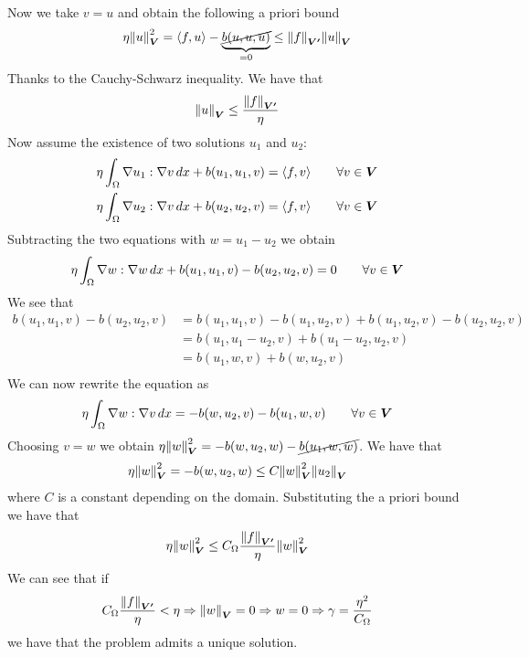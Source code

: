 \begin{enumerate}
\[\begin{split}
        \end{split}
    \]
    Now we take \(v = u\) and obtain the following a priori bound
    \[
        \begin{split}
            \eta \norm{u}_{\bm{V}}^2 = \langle f, u \rangle - \underbrace{\cancel{b(u, u, u)}}_{=0} \leq \norm{f}_{\bm{V'}} \norm{u}_{\bm{V}} 
        \end{split}
    \]
    Thanks to the Cauchy-Schwarz inequality. We have that 
    \[
        \begin{split}
            \norm{u}_{\bm{V}} \leq \frac{\norm{f}_{\bm{V'}}}{\eta}
        \end{split}
    \]
    Now assume the existence of two solutions \(u_1\) and \(u_2\):
    \begin{align*}
        \eta \int_\Omega \nabla u_1 : \nabla v \, dx + b(u_1, u_1, v) &= \langle f, v \rangle \qquad \forall v \in \bm{V} \\
        \eta \int_\Omega \nabla u_2 : \nabla v \, dx + b(u_2, u_2, v) &= \langle f, v \rangle \qquad \forall v \in \bm{V}
    \end{align*}
    Subtracting the two equations with \(w = u_1 - u_2\) we obtain
    \[
        \begin{split}
            \eta \int_\Omega \nabla w : \nabla w \, dx + b(u_1, u_1, v) - b(u_2, u_2, v) = 0 \qquad \forall v \in \bm{V}
        \end{split}
    \]
    We see that 
    \begin{align*}
        b(u_1, u_1, v) - b(u_2, u_2, v) &= b(u_1, u_1, v) - b(u_1, u_2, v) + b(u_1, u_2, v) - b(u_2, u_2, v) \\
        &= b(u_1, u_1 - u_2, v) + b(u_1 - u_2, u_2, v) \\
        &= b(u_1, w, v) + b(w, u_2, v) \\
    \end{align*}
    We can now rewrite the equation as
    \[
        \begin{split}
            \eta \int_\Omega \nabla w : \nabla v \, dx= -b(w, u_2, v) - b(u_1, w, v) \qquad \forall v \in \bm{V}
        \end{split}
    \]
    Choosing \(v = w\) we obtain \(\eta \norm{w}_{\bm{V}}^2 = -b(w, u_2, w) - \cancel{b(u_1, w, w)}\). We have that
    \[
        \begin{split}
            \eta \norm{w}_{\bm{V}}^2 = -b(w, u_2, w) \leq C \norm{w}_{\bm{V}}^2 \norm{u_2}_{\bm{V}}
        \end{split}
    \]
    where \(C\) is a constant depending on the domain. Substituting the a priori bound we have that
    \[
        \begin{split}
             \eta \norm{w}_{\bm{V}}^2 \leq C_\Omega \frac{\norm{f}_{\bm{V'}}}{\eta} \norm{w}_{\bm{V}}^2
        \end{split}
    \]
    We can see that if
    \[
        \begin{split}
            C_\Omega \frac{\norm{f}_{\bm{V'}}}{\eta} < \eta \Rightarrow \norm{w}_{\bm{V}} = 0 \Rightarrow w = 0 \Rightarrow \gamma = \frac{\eta^2}{C_\Omega} 
        \end{split}
    \]
    we have that the problem admits a unique solution. 



\end{enumerate}
